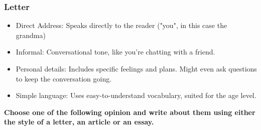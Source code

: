 \documentclass[]{article} %
\begin{document}
\begin{minipage}[h]{0.9\textwidth}
\begin{multicols}{2}
		\subsubsection*{Letter}
		\begin{itemize}
			\item{Direct Address: Speaks directly to the reader ("you", in this case the grandma)}
			\item{Informal: Conversational tone, like you're chatting with a friend.}
			\item{Personal details: Includes specific feelings and plans. Might even ask questions to keep the conversation going.}
			\item{Simple language: Uses easy-to-understand vocabulary, suited for the age level.}
		\end{itemize}
		
	\end{multicols}
\end{minipage}

\newpage

\begin{question}
	\textbf{Choose one of the following opinion and write about them using either the style of a letter, an article or an essay.}
\end{question}	
\end{document}
